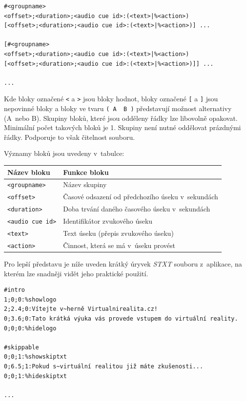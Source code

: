 \begin{verbatim}
#<groupname>
<offset>;<duration>;<audio cue id>:(<text>|%<action>)
[<offset>;<duration>;<audio cue id>:(<text>|%<action>)] ...

[#<groupname>
<offset>;<duration>;<audio cue id>:(<text>|%<action>)
[<offset>;<duration>;<audio cue id>:(<text>|%<action>)]] ...

...
\end{verbatim}

Kde bloky označené \texttt{\textless{}} a \texttt{\textgreater{}} jsou
bloky hodnot, bloky označené \texttt{{[}} a \texttt{{]}} jsou nepovinné
bloky a bloky ve tvaru \texttt{(\ A\ \textbar{}\ B\ )} představují
možnost alternativy (A~nebo B). Skupiny bloků, které jsou odděleny řádky
lze libovolně opakovat. Minimální počet takových bloků je 1. Skupiny
není nutné oddělovat prázdnými řádky. Podporuje to však čitelnost souboru.

\newpage

Významy bloků jsou uvedeny v~tabulce:


\extrarowsep=4pt\begin{longtabu}{XX}
\toprule
Název bloku & Funkce bloku\tabularnewline
\midrule
\endhead
\texttt{\textless{}groupname\textgreater{}} & Název
skupiny\tabularnewline
\texttt{\textless{}offset\textgreater{}} & Časové odsazení od
předchozího úseku v~sekundách\tabularnewline
\texttt{\textless{}duration\textgreater{}} & Doba trvání daného časového
úseku v~sekundách\tabularnewline
\texttt{\textless{}audio\ cue\ id\textgreater{}} & Identifikátor
zvukového úseku\tabularnewline
\texttt{\textless{}text\textgreater{}} & Text úseku (přepis zvukového
úseku)\tabularnewline
\texttt{\textless{}action\textgreater{}} & Činnost, která se má v~úseku
provést\tabularnewline
\bottomrule
\end{longtabu}

Pro lepší představu je níže uveden krátký úryvek \emph{STXT} souboru
z~aplikace, na kterém lze snadněji vidět jeho praktické použití.

\begin{verbatim}
#intro
1;0;0:%showlogo
2;2.4;0:Vítejte v~herně Virtualnirealita.cz!
0;3.6;0:Tato krátká výuka vás provede vstupem do virtuální reality.
0;0;0:%hidelogo

#skippable
0;0;1:%showskiptxt
0;6.5;1:Pokud s~virtuální realitou již máte zkušenosti...
0;0;1:%hideskiptxt

...
\end{verbatim}

